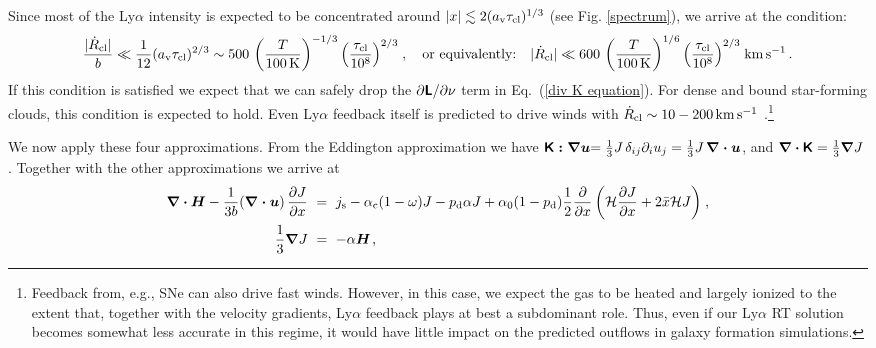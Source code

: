 \documentclass[fleqn,usenatbib]{mnras}
\newcommand{\taucl}{\tau_{\rm cl}}
\begin{document}
\begin{enumerate}
\begin{equation}
    \end{equation}
    Since most of the Ly$\alpha$ intensity is expected to be concentrated around $\lvert x \rvert \lesssim 2 (a_{\rm v} \taucl)^{1/3}$ (see Fig. \ref{spectrum}), we arrive at the condition:
    \begin{equation}
        \dfrac{\lvert \Dot{R}_{\rm cl} \rvert}{b} \ll \dfrac{1}{12} (a_{\rm v} \taucl)^{2/3} \sim 500 \, \left( \dfrac{T}{100 \, \rm K} \right)^{-1/3} \left( \dfrac{\taucl}{10^8} \right)^{2/3} \hspace{1 pt} , \hspace{10 pt} \textrm{or equivalently:}  \hspace{10 pt} \lvert \Dot{R}_{\rm cl} \rvert \ll 600 \, \left( \dfrac{T}{100 \, \rm K} \right)^{1/6} \left( \dfrac{\taucl}{10^8} \right)^{2/3} \hspace{1 pt} \rm km \, s^{-1} \, .
    \end{equation}
    If this condition is satisfied we expect that we can safely drop the $\partial \textbf{\textsf{L}} / \partial \nu$ term in Eq.~(\ref{div K equation}). For dense and bound star-forming clouds, this condition is expected to hold. Even Ly$\alpha$ feedback itself is predicted to drive winds with $\Dot{R}_{\rm cl} \sim 10 - 200 \, \rm km \, s^{-1}$ \citep{Dijkstra2008, Smith2016, Smith2017}.\footnote{Feedback from, e.g., SNe can also drive fast winds. However, in this case, we expect the gas to be heated and largely ionized to the extent that, together with the velocity gradients, Ly$\alpha$ feedback plays at best a subdominant role. Thus, even if our Ly$\alpha$ RT solution becomes somewhat less accurate in this regime, it would have little impact on the predicted outflows in galaxy formation simulations.}

\end{enumerate}
We now apply these four approximations. From the Eddington approximation we have $\textbf{\textsf{K}} \boldsymbol{: \nabla u} = \frac{1}{3} J \, \delta_{ij} \partial_i u_j = \frac{1}{3} J \, \boldsymbol{\nabla \cdot u}$, and $\boldsymbol{\nabla} 
\boldsymbol{\cdot} \textbf{\textsf{K}} =  \frac{1}{3} \boldsymbol{\nabla}J$. Together with the other approximations we arrive at
\begin{align}
     \boldsymbol{\nabla} \boldsymbol{\cdot} \boldsymbol{H} - \dfrac{1}{3 b} (\boldsymbol{\nabla \cdot u}) \, \dfrac{\partial J}{\partial x} ~&=~ j_{\rm s} - \alpha_{\rm c} (1-\omega)J - p_{\rm d} \alpha J + \alpha_0 (1 - p_{\rm d})  \dfrac{1}{2} \dfrac{\partial}{\partial x} \left( \mathcal{H} \dfrac{\partial J}{\partial x} +  2 \Bar{x} \mathcal{H} J \right)  \hspace{1 pt} , \\
     \dfrac{1}{3} \boldsymbol{\nabla} J  ~&=~  - \alpha \boldsymbol{H} \hspace{1 pt} ,
\end{align}
\end{document}
